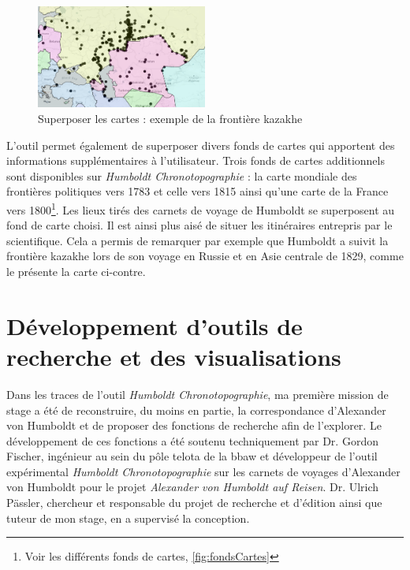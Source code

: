 \documentclass[a4paper, 12pt, twoside]{book}
\begin{document}
\begin{figure}
\includegraphics[width=0.5\textwidth]{img/chronotopographie/chrono_kazakhstan.png}
\caption{Superposer les cartes : exemple de la frontière kazakhe}
\end{figure}
L'outil permet également de superposer divers fonds de cartes qui apportent des informations supplémentaires à l'utilisateur. Trois fonds de cartes additionnels sont disponibles sur \textit{Humboldt Chronotopographie} : la carte mondiale des frontières politiques vers 1783 et celle vers 1815 ainsi qu'une carte de la France vers 1800\footnote{Voir les différents fonds de cartes,  \autoref{fig:fondsCartes}}. Les lieux tirés des carnets de voyage de Humboldt se superposent au fond de carte choisi. Il est ainsi plus aisé de situer les itinéraires entrepris par le scientifique. Cela a permis de remarquer par exemple que Humboldt a suivit la frontière kazakhe lors de son voyage en Russie et en Asie centrale de 1829, comme le présente la carte ci-contre. 


\chapter{Développement d'outils de recherche et des visualisations}
\label{chap:rechercheEtViz}
Dans les traces de l'outil \textit{Humboldt Chronotopographie}, ma première mission de stage a été de reconstruire, du moins en partie, la correspondance d'Alexander von Humboldt et de proposer des fonctions de recherche afin de l'explorer. Le développement de ces fonctions a été soutenu techniquement par Dr. Gordon Fischer, ingénieur au sein du pôle \gls{telota} de la \gls{bbaw} et développeur de l'outil expérimental \textit{Humboldt Chronotopographie} sur les carnets de voyages d'Alexander von Humboldt pour le projet \textit{Alexander von Humboldt auf Reisen}. Dr. Ulrich Pässler, chercheur et responsable du projet de recherche et d'édition ainsi que tuteur de mon stage, en a supervisé la conception. 
\end{document}
